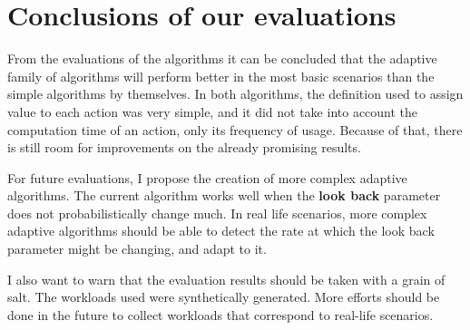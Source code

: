 \section{Conclusions of our evaluations}
From the evaluations of the algorithms it can be concluded that the adaptive family of algorithms will perform better in the most basic scenarios than the simple algorithms by themselves.  In both algorithms, the definition used to assign value to each action was very simple, and it did not take into account the computation time of an action, only its frequency of usage.  Because of that, there is still room for improvements on the already promising results. 

For future evaluations, I propose the creation of more complex adaptive algorithms.  The current algorithm works well when the \textbf{look back} parameter does not probabilistically change much.  In real life scenarios, more complex adaptive algorithms should be able to detect the rate at which the look back parameter might be changing, and adapt to it.

I also want to warn that the evaluation results should be taken with a grain of salt. The workloads used were synthetically generated.  More efforts should be done in the future to collect workloads that correspond to real-life scenarios.